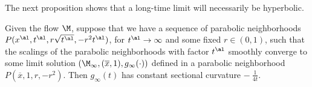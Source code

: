 The next proposition shows that a long-time limit will
necessarily be hyperbolic.
\begin{proposition}
  \label{prop:kl-noncollapsed-pointed-limits-hyperbolic-convergence-noncollapsing}
 \label{propII.7.1}
Given the flow $\M$,
suppose that we have a sequence of parabolic neighborhoods
$P(x^\al, t^\al, r \sqrt{t^\al}, - r^2 t^\al)$, for
$t^\al \rightarrow \infty$ and some fixed $r \in (0,1)$, such that
the scalings of the parabolic neighborhoods with factor
$t^\al$ smoothly converge to some limit
solution $(\M_\infty, (\overline{x}, 1), g_\infty(\cdot))$
defined in a parabolic neighborhood
$P(\overline{x}, 1, r, -r^2)$. Then $g_\infty(t)$ has
constant sectional curvature $- \: \frac{1}{4t}$.
\end{proposition}
